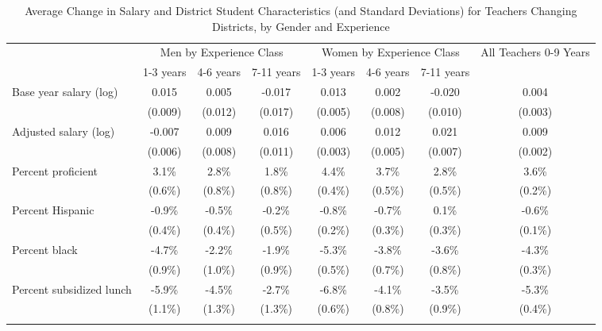\documentclass[]{article}
\begin{document}
\begin{longtable}{lccccccc}
  \hline
 & \multicolumn{3}{c}{Men by Experience Class} & \multicolumn{3}{c}{Women by Experience Class} & \multirow{2}{*}{\parbox{0.16\linewidth}{All Teachers 0-9 Years}}\\ \cline{2-4} \cline{5-7}
 & 1-3 years & 4-6 years & 7-11 years & 1-3 years & 4-6 years & 7-11 years &  \\ 
  \hline
Base year salary (log) & 0.015 & 0.005 & -0.017 & 0.013 & 0.002 & -0.020 & 0.004 \\ 
   & (0.009) & (0.012) & (0.017) & (0.005) & (0.008) & (0.010) & (0.003) \\ 
  Adjusted salary (log) & -0.007 & 0.009 & 0.016 & 0.006 & 0.012 & 0.021 & 0.009 \\ 
   & (0.006) & (0.008) & (0.011) & (0.003) & (0.005) & (0.007) & (0.002) \\ 
  Percent proficient & 3.1\% & 2.8\% & 1.8\% & 4.4\% & 3.7\% & 2.8\% & 3.6\% \\ 
   & (0.6\%) & (0.8\%) & (0.8\%) & (0.4\%) & (0.5\%) & (0.5\%) & (0.2\%) \\ 
  Percent Hispanic & -0.9\% & -0.5\% & -0.2\% & -0.8\% & -0.7\% & 0.1\% & -0.6\% \\ 
   & (0.4\%) & (0.4\%) & (0.5\%) & (0.2\%) & (0.3\%) & (0.3\%) & (0.1\%) \\ 
  Percent black & -4.7\% & -2.2\% & -1.9\% & -5.3\% & -3.8\% & -3.6\% & -4.3\% \\ 
   & (0.9\%) & (1.0\%) & (0.9\%) & (0.5\%) & (0.7\%) & (0.8\%) & (0.3\%) \\ 
  Percent subsidized lunch & -5.9\% & -4.5\% & -2.7\% & -6.8\% & -4.1\% & -3.5\% & -5.3\% \\ 
   & (1.1\%) & (1.3\%) & (1.3\%) & (0.6\%) & (0.8\%) & (0.9\%) & (0.4\%) \\ 
   \hline
\caption{Average Change in Salary and District Student Characteristics (and Standard Deviations) for Teachers Changing Districts, by Gender and Experience} 
\label{tbl:change_by_ge}
\end{longtable}
\end{document}
